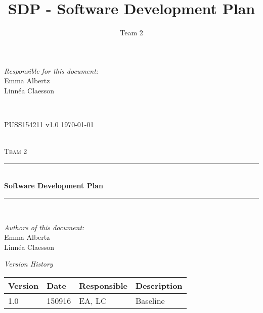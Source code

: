\documentclass[a4paper]{article}
\title{SDP - Software Development Plan}
\author{Team 2}
\begin{document}
\begin{titlepage}
\newcommand{\HRule}{\rule{\linewidth}{0.5mm}}

\begin{minipage}{0.5\textwidth}
\begin{flushleft} %
\textit{Responsible for this document:}\\
Emma Albertz \\
Linnéa Claesson
\end{flushleft}
\end{minipage}
~
\begin{minipage}{0.4\textwidth}
\begin{flushright}
PUSS154211 v1.0 
\today
\end{flushright}
\end{minipage}\\[3cm]

\centering
\textsc{\LARGE Team 2}\\[0.5cm]

\HRule \\[0.4cm]
{ \huge \bfseries Software Development Plan}\\[0.4cm] %
\HRule \\[1.5cm]

\vfill
\begin{flushleft}
\textit{Authors of this document:}\\
Emma Albertz \\
Linnéa Claesson
\end{flushleft}



\end{titlepage}



\begin{center}
\textit{\large Version History}

    \begin{tabular}{ | l | l | l | p{5cm} |}
    \hline
    \textbf{Version} & \textbf{Date} & \textbf{Responsible} & \textbf{Description} \\ \hline
    1.0 & 150916 & EA, LC & Baseline\\ \hline
    \end{tabular}
\end{center}



\setcounter{tocdepth}{2}
\tableofcontents
\newpage
{}
\end{document}
